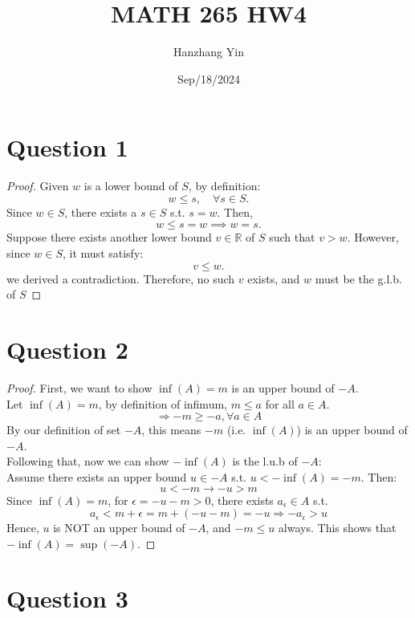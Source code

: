 \documentclass{article}
\title{MATH 265 HW4}
\author{Hanzhang Yin}
\date{Sep/18/2024}
\begin{document}
\maketitle

\section*{Question 1}
\begin{proof}
    Given \( w \) is a lower bound of \( S \), by definition:
    \[ w \leq s, \quad \forall s \in S. \]
    Since \( w \in S \), there exists a \(s \in S\) s.t. \( s = w \). Then,
    \[ w \leq s = w \implies w = s. \]
    Suppose there exists another lower bound \( v \in \mathbb{R} \) of \( S \) such that \( v > w \).
    However, since \( w \in S \), it must satisfy:
    \[ v \leq w. \]
    we derived a contradiction.
    Therefore, no such \( v \) exists, and \( w \) must be the g.l.b. of $S$
\end{proof}

\section*{Question 2}
\begin{proof}
    First, we want to show $\inf(A) = m$ is an upper bound of $-A$.
    \\
    Let $\inf(A) = m$, by definition of infimum, $m \leq a$ for all $a \in A$.
    \[ \Rightarrow -m \geq -a, \forall a \in A \]
    By our definition of set $-A$, this means $-m$ (i.e. $\inf(A)$) is an upper bound of $-A$.
    \\
    Following that, now we can show $-\inf(A)$ is the l.u.b of $-A$:
    \\
    Assume there exists an upper bound $u \in -A$ s.t. $u < -\inf(A) = -m$. Then:
    \[ u < -m \rightarrow -u > m \]
    Since $\inf(A) = m$, for $\epsilon = -u - m > 0$, there exists $a_{\epsilon} \in A$ s.t. 
    \[ a_{\epsilon} < m + \epsilon = m + (-u - m) = -u \Rightarrow -a_{\epsilon} > u \]
    Hence, $u$ is NOT an upper bound of $-A$, and $-m \leq u$ always. This shows that $-\inf(A) = \sup(-A)$.
\end{proof}

\section*{Question 3}
\end{document}
